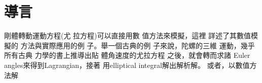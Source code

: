 \documentclass{article}
\newcommand*{\kai}{\CJKfamily{kai}}
\begin{document}
\part{導言}


{\kai 剛體轉動運動方程}(尤%
拉方程)可以直接用數%
值方法來模擬，這裡%
詳述了其數值模擬的%
方法與實際應用的例%
子。舉一個古典的例%
子來說，陀螺的三維%
運動，幾乎所有古典%
力學的書上推導出貼%
體角速度的尤拉方程%
之後，就會轉而求諸%
Euler angles來得到Lagrangian，接著%
用elliptical integral解出解析解。%
或者，以數值方法解%
\end{document}
